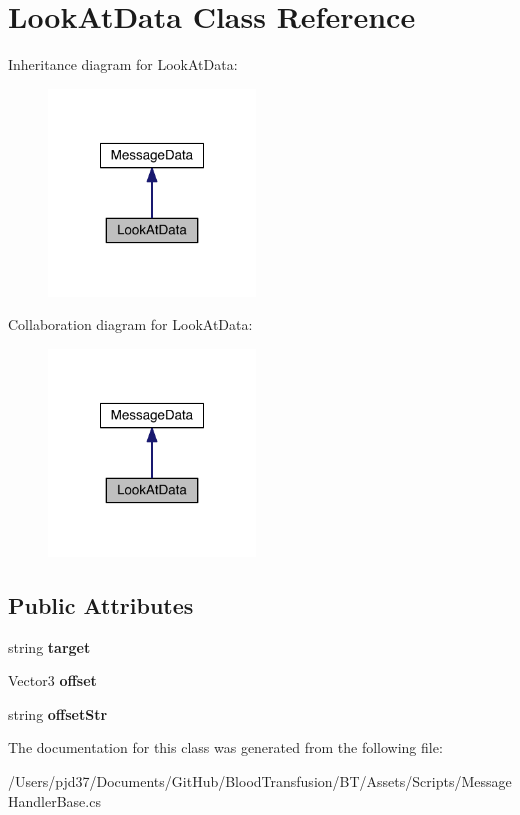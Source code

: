 \hypertarget{class_look_at_data}{}\section{Look\+At\+Data Class Reference}
\label{class_look_at_data}


Inheritance diagram for Look\+At\+Data\+:\nopagebreak
\begin{figure}[H]
\begin{center}
\leavevmode
\includegraphics[width=156pt]{class_look_at_data__inherit__graph}
\end{center}
\end{figure}


Collaboration diagram for Look\+At\+Data\+:\nopagebreak
\begin{figure}[H]
\begin{center}
\leavevmode
\includegraphics[width=156pt]{class_look_at_data__coll__graph}
\end{center}
\end{figure}
\subsection*{Public Attributes}
\begin{DoxyCompactItemize}
\item 
string {\bfseries target}\hypertarget{class_look_at_data_a522204439b1ab0c51364c00a02d12f58}{}\label{class_look_at_data_a522204439b1ab0c51364c00a02d12f58}

\item 
Vector3 {\bfseries offset}\hypertarget{class_look_at_data_a0b0b76dc875aa1be560e987dd17baa93}{}\label{class_look_at_data_a0b0b76dc875aa1be560e987dd17baa93}

\item 
string {\bfseries offset\+Str}\hypertarget{class_look_at_data_aa36e5ba96bd1277fbb83c290ef32ea65}{}\label{class_look_at_data_aa36e5ba96bd1277fbb83c290ef32ea65}

\end{DoxyCompactItemize}


The documentation for this class was generated from the following file\+:\begin{DoxyCompactItemize}
\item 
/\+Users/pjd37/\+Documents/\+Git\+Hub/\+Blood\+Transfusion/\+B\+T/\+Assets/\+Scripts/Message\+Handler\+Base.\+cs\end{DoxyCompactItemize}
